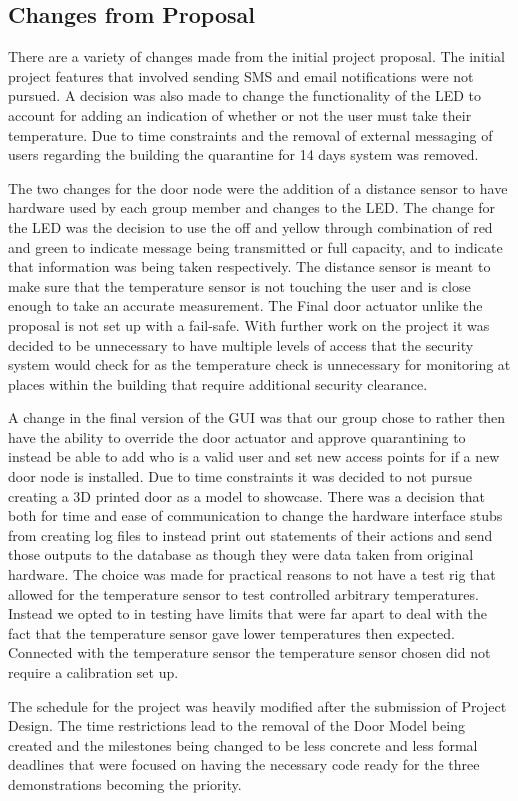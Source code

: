 \subsection{Changes from Proposal}
There are a variety of changes made from the initial project proposal. The initial project features that involved sending SMS and email notifications were not pursued. A decision was also made to change the functionality of the LED to account for adding an indication of whether or not the user must take their temperature. Due to time constraints and the removal of external messaging of users regarding the building the quarantine for 14 days system was removed.

The two changes for the door node were the addition of a distance sensor to have hardware used by each group member and changes to the LED. The change for the LED was the decision to use the off and yellow through combination of red and green to indicate message being transmitted or full capacity, and to indicate that information was being taken respectively. The distance sensor is meant to make sure that the temperature sensor is not touching the user and is close enough to take an accurate measurement. The Final door actuator unlike the proposal is not set up with a fail-safe. With further work on the project it was decided to be unnecessary to have multiple levels of access that the security system would check for as the temperature check is unnecessary for monitoring at places within the building that require additional security clearance.

A change in the final version of the GUI was that our group chose to rather then have the ability to override the door actuator and approve quarantining to instead be able to add who is a valid user and set new access points for if a new door node is installed. Due to time constraints it was decided to not pursue creating a 3D printed door as a model to showcase. There was a decision that both for time and ease of communication to change the hardware interface stubs from creating log files to instead print out statements of their actions and send those outputs to the database as though they were data taken from original hardware. The choice was made for practical reasons to not have a test rig that allowed for the temperature sensor to test controlled arbitrary temperatures. Instead we opted to in testing have limits that were far apart to deal with the fact that the temperature sensor gave lower temperatures then expected. Connected with the temperature sensor the temperature sensor chosen did not require a calibration set up.

The schedule for the project was heavily modified after the submission of Project Design. The time restrictions lead to the removal of the Door Model being created and the milestones being changed to be less concrete and less formal deadlines that were focused on having the necessary code ready for the three demonstrations becoming the priority.
